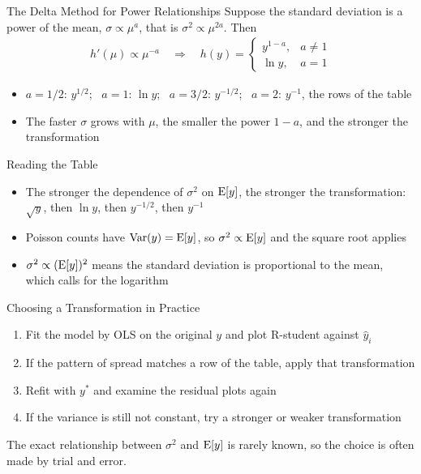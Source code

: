 \begin{frame}{The Delta Method for Power Relationships}
Suppose the standard deviation is a power of the mean, $\sigma \propto \mu^{a}$, that is $\sigma^2 \propto \mu^{2a}$. Then
\begin{align*}
    h'(\mu) \propto \mu^{-a}
    \quad\Longrightarrow\quad
    h(y) =
    \begin{cases}
        y^{1-a}, & a \neq 1 \\
        \ln y, & a = 1
    \end{cases}
\end{align*}
\begin{itemize}
    \item $a = 1/2$: $y^{1/2}$; \ $a = 1$: $\ln y$; \ $a = 3/2$: $y^{-1/2}$; \ $a = 2$: $y^{-1}$, the rows of the table
    \item The faster $\sigma$ grows with $\mu$, the smaller the power $1 - a$, and the stronger the transformation
\end{itemize}
\end{frame}


\begin{frame}{Reading the Table}
\begin{itemize}
    \item The stronger the dependence of $\sigma^2$ on $\operatorname{E}[y]$, the stronger the transformation: $\sqrt{y}$, then $\ln y$, then $y^{-1/2}$, then $y^{-1}$
    \item Poisson counts have $\operatorname{Var}(y) = \operatorname{E}[y]$, so $\sigma^2 \propto \operatorname{E}[y]$ and the square root applies
    \item $\sigma^2 \propto (\operatorname{E}[y])^2$ means the standard deviation is proportional to the mean, which calls for the logarithm
\end{itemize}
\end{frame}


\begin{frame}{Choosing a Transformation in Practice}
\begin{enumerate}
    \item Fit the model by OLS on the original $y$ and plot R-student against $\hat{y}_i$
    \item If the pattern of spread matches a row of the table, apply that transformation
    \item Refit with $y^*$ and examine the residual plots again
    \item If the variance is still not constant, try a stronger or weaker transformation
\end{enumerate}
The exact relationship between $\sigma^2$ and $\operatorname{E}[y]$ is rarely known, so the choice is often made by trial and error.
\end{frame}


